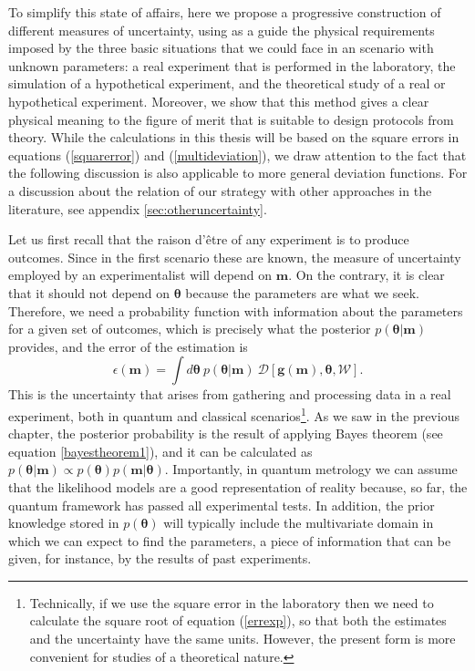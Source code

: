 To simplify this state of affairs, here we propose a progressive construction of different measures of uncertainty, using as a guide the physical requirements imposed by the three basic situations that we could face in an scenario with unknown parameters: a real experiment that is performed in the laboratory, the simulation of a hypothetical experiment, and the theoretical study of a real or hypothetical experiment. Moreover, we show that this method gives a clear physical meaning to the figure of merit that is suitable to design protocols from theory. While the calculations in this thesis will be based on the square errors in equations (\ref{squarerror}) and (\ref{multideviation}), we draw attention to the fact that the following discussion is also applicable to more general deviation functions. For a discussion about the relation of our strategy with other approaches in the literature, see appendix \ref{sec:otheruncertainty}. 

Let us first recall that the raison d'\^{e}tre of any experiment is to produce outcomes. Since in the first scenario these are known, the measure of uncertainty employed by an experimentalist will depend on $\boldsymbol{m}$. On the contrary, it is clear that it should not depend on $\boldsymbol{\theta}$ because the parameters are what we seek. Therefore, we need a probability function with information about the parameters for a given set of outcomes, which is precisely what the posterior $p(\boldsymbol{\theta}|\boldsymbol{m})$ provides, and the error of the estimation is
\begin{equation}
\epsilon(\boldsymbol{m}) = \int d\boldsymbol{\theta} ~p(\boldsymbol{\theta}|\boldsymbol{m}) ~\mathcal{D}[\boldsymbol{g}(\boldsymbol{m}),\boldsymbol{\theta}, \mathcal{W}].
\label{errexp}
\end{equation}
This is the uncertainty that arises from gathering and processing data in a real experiment, both in quantum \cite{PaulProctor2016} and classical \cite{jaynes2003} scenarios\footnote{Technically, if we use the square error in the laboratory then we need to calculate the square root of equation (\ref{errexp}), so that both the estimates and the uncertainty have the same units. However, the present form is more convenient for studies of a theoretical nature.}. As we saw in the previous chapter, the posterior probability is the result of applying Bayes theorem (see equation \ref{bayestheorem1}), and it can be calculated as $p(\boldsymbol{\theta}|\boldsymbol{m}) \propto p(\boldsymbol{\theta}) p(\boldsymbol{m}|\boldsymbol{\theta})$. Importantly, in quantum metrology we can assume that the likelihood models are a good representation of reality because, so far, the quantum framework has passed all experimental tests. In addition, the prior knowledge stored in $p(\boldsymbol{\theta})$ will typically include the multivariate domain in which we can expect to find the parameters, a piece of information that can be given, for instance, by the results of past experiments. 

